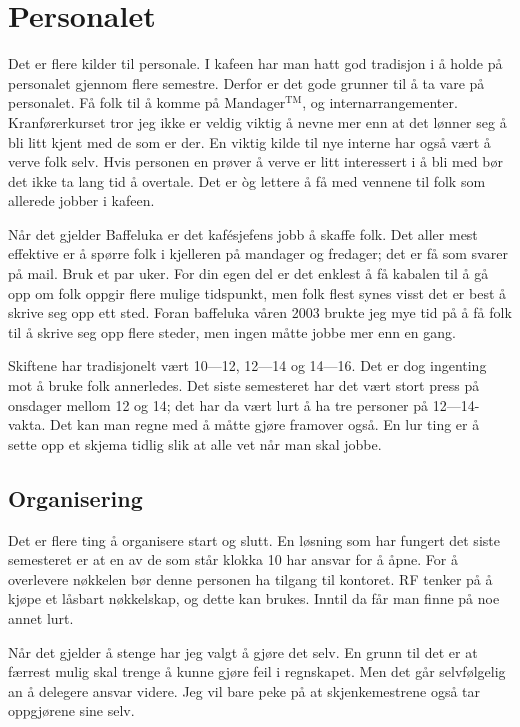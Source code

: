 \section{Personalet}
Det er flere kilder til personale. I kafeen har man hatt god tradisjon i å holde på
personalet gjennom flere semestre. Derfor er det gode grunner til å ta vare på
personalet. Få folk til å komme på Mandager$^\text{TM}$, og internarrangementer.
Kranførerkurset tror jeg ikke er veldig viktig å nevne mer enn at det lønner seg
å bli litt kjent med de som er der. En viktig kilde til nye interne har også
vært å verve folk selv. Hvis personen en prøver å verve er litt interessert i
å bli med bør det ikke ta lang tid å overtale. Det er \`og lettere å få med
vennene til folk som allerede jobber i kafeen.

Når det gjelder Baffeluka er det kaf\'esjefens jobb å skaffe folk. Det aller mest
effektive er å spørre folk i kjelleren på mandager og fredager; det er få som
svarer på mail. Bruk et par uker. For din egen del er det enklest å få kabalen
til å gå opp om folk oppgir flere mulige tidspunkt, men folk flest synes visst
det er best å skrive seg opp ett sted. Foran baffeluka våren 2003 brukte jeg
mye tid på å få folk til å skrive seg opp flere steder, men ingen måtte
jobbe mer enn en gang.

Skiftene har tradisjonelt vært 10---12, 12---14 og 14---16. Det er dog ingenting
mot å bruke folk annerledes. Det siste semesteret har det vært stort press på
onsdager mellom 12 og 14; det har da vært lurt å ha tre personer på 12---14-vakta.
Det kan man regne med å måtte gjøre framover også.
En lur ting er å sette opp et skjema tidlig slik at alle vet når man skal jobbe.

\subsection{Organisering}
Det er flere ting å organisere start og slutt. En løsning som har fungert det
siste semesteret er at en av de som står klokka 10 har ansvar for å åpne.
For å overlevere nøkkelen bør denne personen ha tilgang til kontoret.
RF tenker på å kjøpe et låsbart nøkkelskap, og dette kan brukes. Inntil
da får man finne på noe annet lurt.

Når det gjelder å stenge har jeg valgt å gjøre det selv. En grunn til det
er at færrest mulig skal trenge å kunne gjøre feil i regnskapet. Men
det går selvfølgelig an å delegere ansvar videre. Jeg vil bare peke
på at skjenkemestrene også tar oppgjørene sine selv.

